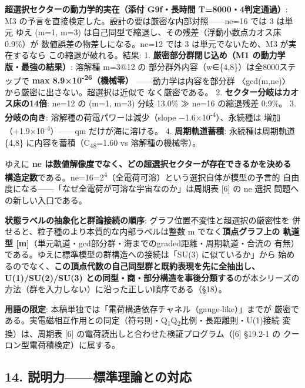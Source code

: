 \documentclass[
]{ltjarticle}
\begin{document}
\textbf{超選択セクターの動力学的実在（添付 G9f・長時間
T=8000・4判定通過）}: M3
の予言を直接検定した。設計の要は厳密な内部対照------ne=16 では 3 は単元
ゆえ (m=1, m=3) は自己同型で縮退し、その残差（浮動小数点カオス床
0.9\%）が 数値誤差の物差しになる。ne=12 では 3 は単元でないため、M3
が実在するなら この縮退が破れる。結果: 1. \textbf{厳密部分群閉じ込め（M1
の動力学版・最強の結果）}: 溶解種 m=3@12 の
部分群外内容（w∈\{4,8\}）は全8000ステップで \textbf{max
8.9×10\textsuperscript{-26}（機械零）} ------動力学は内容を部分群
〈gcd(m,ne)〉 から厳密に出さない。超選択は近似で なく厳密である。 2.
\textbf{セクター分岐はカオス床の14倍}: ne=12 の (m=1, m=3) 分岐 13.0\% ≫
ne=16 の縮退残差 0.9\%。 3. \textbf{分岐の向き}:
溶解種の荷電パワーは減少（slope −1.6×10\textsuperscript{-4}）、永続種は
増加（+1.9×10\textsuperscript{-4}）------q\textbar m だけが海に溶ける。
4. \textbf{周期軌道蓄積}: 永続種は周期軌道 \{4,8\}
に内容を蓄積（C\textsubscript{48}=1.60 vs 溶解種の機械零）。

ゆえに \textbf{ne
は数値解像度でなく、どの超選択セクターが存在できるかを決める
構造定数}である。ne=16=2\textsuperscript{4}（全電荷可溶）という選択自体が模型の予言的
自由度になる------「なぜ全電荷が可溶な宇宙なのか」は周期表 {[}6{]} の ne
選択 問題への新しい入口である。

\textbf{状態ラベルの抽象化と群論接続の順序}:
グラフ位置不変性と超選択の厳密性を
併せると、粒子種のより本質的な内部ラベルは整数 m
でなく\textbf{頂点グラフ上の 軌道型
{[}m{]}}（単元軌道・gcd部分群・海までのgraded距離・周期軌道・合流の
有無）である。ゆえに標準模型の群構造への接続は「SU(3) に似ているか」から
始めるのでなく、\textbf{この頂点代数の自己同型群と既約表現を先に全抽出し、
U(1)/SU(2)/SU(3) との同型・商・部分構造を事後分類する}のが本シリーズの
方法（群を入力しない）に沿った正しい順序である（§18）。

\textbf{用語の限定}:
本稿単独では「電荷構造依存チャネル（gauge-like）」までが
厳密である。実電磁相互作用との同定（符号則・Q\textsubscript{1}Q\textsubscript{2}比例・長距離則・U(1)接続
変換）は、周期表 {[}6{]} の電荷読出しと合わせた検証プログラム（{[}6{]}
§19.2-1 の クーロン型電荷積検定）に属する。

\subsection{14.
説明力------標準理論との対応}\label{ux8aacux660eux529bux6a19ux6e96ux7406ux8ad6ux3068ux306eux5bfeux5fdc}
\end{document}
